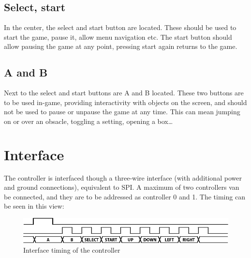 \subsection{Select, start}
In the center, the select and start button are located.
These should be used to start the game, pause it, allow menu navigation etc.
The start button should allow pausing the game at any point, pressing start again returns to the game.

\subsection{A and B}
Next to the select and start buttons are A and B located.
These two buttons are to be used in-game, providing interactivity with objects on the screen, and should not be used to pause or unpause the game at any time.
This can mean jumping on or over an obsacle, toggling a setting, opening a box\ldots

\section{Interface}
The controller is interfaced though a three-wire interface (with additional power and ground connections), equivalent to SPI.
A maximum of two controllers van be connected, and they are to be addressed as controller 0 and 1. The timing can be seen in this view:

\begin{figure}[h]
    \centering
	\includegraphics[width=\textwidth]{GameController/ControllerInterface.PNG}
    \caption{Interface timing of the controller}\par
    \label{fig:GameController}
\end{figure}